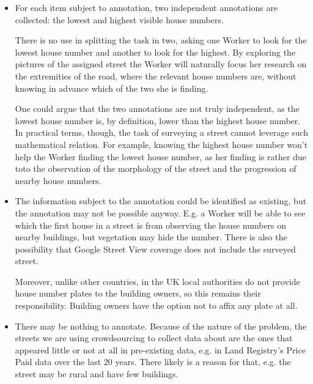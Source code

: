     \begin{itemize}
        
        \item For each item subject to annotation, two independent annotations are collected: the lowest and highest visible house numbers. 
        
        There is no use in splitting the task in two, asking one Worker to look for the lowest house number and another to look for the highest. By exploring the pictures of the assigned street the Worker will naturally focus her research on the extremities of the road, where the relevant house numbers are, without knowing in advance which of the two she is finding.
        
        One could argue that the two annotations are not truly independent, as the lowest house number is, by definition, lower than the highest house number. In practical terms, though, the task of surveying a street cannot leverage such mathematical relation. For example, knowing the highest house number won't help the Worker finding the lowest house number, as her finding is rather due toto the observation of the morphology of the street and the progression of nearby house numbers. 
        
        \item The information subject to the annotation could be identified as existing, but the annotation may not be possible anyway. E.g. a Worker will be able to see which the first house in a street is from observing the house numbers on nearby buildings, but vegetation may hide the number. There is also the possibility that Google Street View coverage does not include the surveyed street.
        
        Moreover, unlike other countries, in the UK local authorities do not provide house number plates to the building owners, so this remains their responsibility. Building owners have the option not to affix any plate at all. 
        
        \item There may be nothing to annotate. Because of the nature of the problem, the streets we are using crowdsourcing to collect data about are the ones that appeared little or not at all in pre-existing data, e.g. in Land Registry's Price Paid data over the last 20 years. There likely is a reason for that, e.g. the street may be rural and have few buildings. 
        
    \end{itemize}
    

